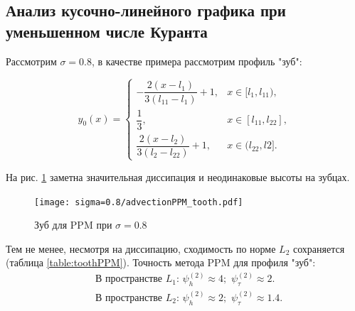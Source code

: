 \documentclass[12pt,a4paper]{article}
\newcommand{\picref}[1]{рис. \ref{#1}}
\newcommand{\tabref}[1]{таблица \ref{#1}}
\begin{document}
    \pagebreak

    \subsection{Анализ кусочно-линейного графика при уменьшенном числе Куранта }

    Рассмотрим $ \sigma = 0.8 $, в качестве примера рассмотрим профиль "зуб":

    \[
        y_0(x) = \begin{cases}
            -\dfrac{2(x-l_1)}{3(l_{11}-l_1)} + 1, & x \in [l_1, l_{11}), \\[0.7em]
               \dfrac{1}{3}, & x \in [l_{11}, l_{22}],
               \\[0.7em]
           \dfrac{2(x-l_{2})}{3(l_2 - l_{22})} + 1, & x \in (l_{22}, l2].
       \end{cases}   
    \]

    На \picref{fig:ppm_tooth_08} заметна значительная диссипация и неодинаковые высоты на зубцах. 

    \begin{figure}[h]
        \centering
        \texttt{[image: sigma=0.8/advectionPPM\_tooth.pdf]}
        \caption{Зуб для PPM при $ \sigma = 0.8 $}
        \label{fig:ppm_tooth_08}
    \end{figure}

    Тем не менее, несмотря на диссипацию, сходимость по норме $ L_2 $ сохраняется (\tabref{table:toothPPM}). Точность метода PPM для профиля "зуб":
    \[
        \begin{split}
        &\text{В пространстве $L_1$}\colon \, \psi_{h}^{(2)} \approx 4;\,\, \psi_{\tau}^{(2)} \approx 2.
        \\[0.5em]
        & \text{В пространстве $L_2$}\colon \, \psi_{h}^{(2)}\approx 2;\,\, \psi_{\tau}^{(2)} \approx 1.4.
        \end{split}
    \]
\end{document}
